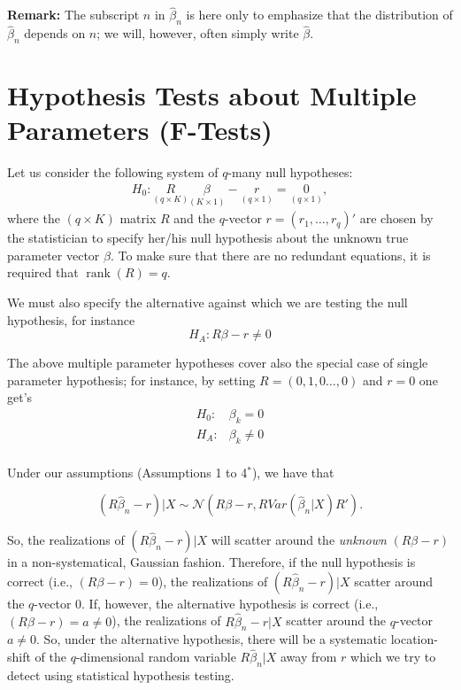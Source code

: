 \documentclass[
  letterpaper,
  DIV=11,
  numbers=noendperiod]{scrreprt}
\theoremstyle{definition}
\theoremstyle{plain}
\theoremstyle{plain}
\theoremstyle{remark}
\begin{document}
\textbf{Remark:} The subscript \(n\) in \(\hat\beta_n\) is here only to
emphasize that the distribution of \(\hat\beta_n\) depends on \(n\); we
will, however, often simply write \(\hat\beta\).

\hypertarget{sec-testmultp}{%
\section{Hypothesis Tests about Multiple Parameters
(F-Tests)}\label{sec-testmultp}}

Let us consider the following system of \(q\)-many null hypotheses:
\begin{align*}
H_0: \underset{(q\times K)}{R}\underset{(K\times 1)}{\beta} - \underset{(q\times 1)}{r} = \underset{(q\times 1)}{0},
\end{align*} where the \((q \times K)\) matrix \(R\) and the
\(q\)-vector \(r=(r_{1},\dots,r_{q})'\) are chosen by the statistician
to specify her/his null hypothesis about the unknown true parameter
vector \(\beta\). To make sure that there are no redundant equations, it
is required that \(\operatorname{rank}(R)=q\).

We must also specify the alternative against which we are testing the
null hypothesis, for instance \begin{equation*}
H_A: R\beta -r \neq 0
\end{equation*}

The above multiple parameter hypotheses cover also the special case of
single parameter hypothesis; for instance, by setting
\(R=(0,1,0\dots,0)\) and \(r=0\) one get's \begin{equation*}
\begin{array}{ll}
H_0:  & \beta_{k}=0 \\
H_A:  & \beta_{k} \ne 0 \\
\end{array}
\end{equation*}

Under our assumptions (Assumptions 1 to 4\(^\ast\)), we have that

\[
(R\hat\beta_n-r)|X\sim\mathcal{N}\left(R\beta -r,RVar(\hat\beta_n|X)R'\right).
\]

So, the realizations of \((R\hat\beta_n -r)|X\) will scatter around the
\emph{unknown} \((R\beta -r)\) in a non-systematical, Gaussian fashion.
Therefore, if the null hypothesis is correct (i.e., \((R\beta-r)=0\)),
the realizations of \((R\hat\beta_n-r)|X\) scatter around the
\(q\)-vector \(0\). If, however, the alternative hypothesis is correct
(i.e., \((R\beta-r)=a\neq 0\)), the realizations of \(R\hat\beta_n-r|X\)
scatter around the \(q\)-vector \(a\neq 0\). So, under the alternative
hypothesis, there will be a systematic location-shift of the
\(q\)-dimensional random variable \(R\hat\beta_n|X\) away from \(r\)
which we try to detect using statistical hypothesis testing.
\end{document}
